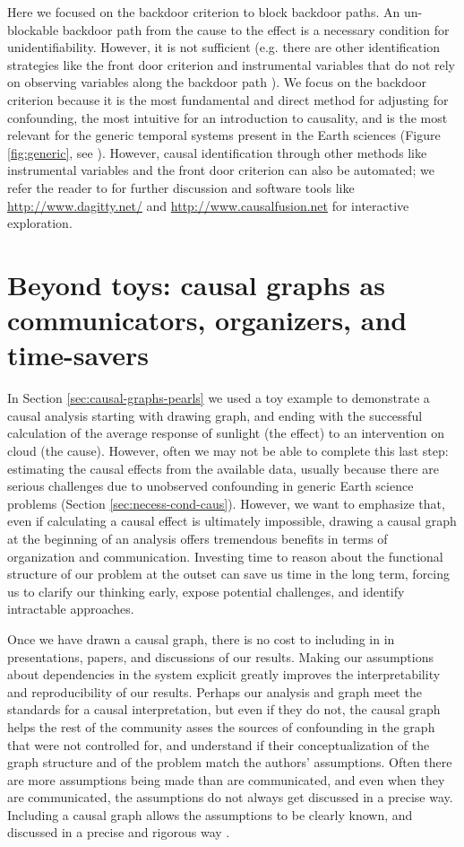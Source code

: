 \documentclass[12pt]{article}
\begin{document}
Here we focused on the backdoor criterion to block backdoor paths. An
un-blockable backdoor path from the cause to the effect is a necessary
condition for unidentifiability. However, it is not sufficient
(e.g. there are other identification strategies like the front door
criterion and instrumental variables that do not rely on observing
variables along the backdoor path \citep{pearl2009causality}). We
focus on the backdoor criterion because it is the most fundamental and
direct method for adjusting for confounding, the most intuitive for an
introduction to causality, and is the most relevant for the generic
temporal systems present in the Earth sciences (Figure
\ref{fig:generic}, see \citet{tian2002general}).  However, causal
identification through other methods like instrumental variables and
the front door criterion can also be automated; we refer the reader to
\citet{pearl2009causality} for further discussion and software tools
like \url{http://www.dagitty.net/} and
\url{http://www.causalfusion.net} for interactive exploration.


\section{Beyond toys: causal graphs as communicators, organizers, and
  time-savers}\label{sec:causal-graphs-as}

In Section \ref{sec:causal-graphs-pearls} we used a toy example to
demonstrate a causal analysis starting with drawing graph, and ending
with the successful calculation of the average response of sunlight
(the effect) to an intervention on cloud (the cause). However, often
we may not be able to complete this last step: estimating the causal
effects from the available data, usually because there are serious
challenges due to unobserved confounding in generic Earth science
problems (Section \ref{sec:necess-cond-caus}). However, we want to
emphasize that, even if calculating a causal effect is ultimately
impossible, drawing a causal graph at the beginning of an analysis
offers tremendous benefits in terms of organization and
communication. Investing time to reason about the functional structure
of our problem at the outset can save us time in the long term,
forcing us to clarify our thinking early, expose potential challenges,
and identify intractable approaches.

Once we have drawn a causal graph, there is no cost to including in in
presentations, papers, and discussions of our results. Making our
assumptions about dependencies in the system explicit greatly improves
the interpretability and reproducibility of our results. Perhaps our
analysis and graph meet the standards for a causal interpretation, but
even if they do not, the causal graph helps the rest of the community
asses the sources of confounding in the graph that were not controlled
for, and understand if their conceptualization of the graph structure
and of the problem match the authors' assumptions. Often there are
more assumptions being made than are communicated, and even when they
are communicated, the assumptions do not always get discussed in a
precise way. Including a causal graph allows the assumptions to be
clearly known, and discussed in a precise and rigorous way
\citep{hannart-da}.
\end{document}
